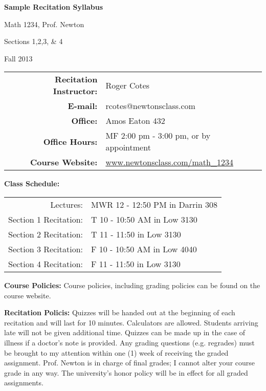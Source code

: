 \documentclass[fleqn, letterpaper]{article}
\begin{document}
\noindent




\begin{center}\textbf{Sample Recitation Syllabus}\end{center}

\noindent
\begin{bf}
Math 1234, Prof. Newton

Sections 1,2,3, \& 4

Fall 2013
\end{bf}

\vspace{.5 cm}

\noindent
\begin{tabular}{rl}

\bf{Recitation Instructor:} & Roger Cotes \\

\bf{E-mail:} & rcotes@newtonsclass.com \\

\bf{Office:} & Amos Eaton 432 \\

\bf{Office Hours:} & MF 2:00 pm - 3:00 pm, or by appointment \\

\bf{Course Website:} & \url{www.newtonsclass.com/math_1234} \\

\end{tabular}

\vspace{.5 cm}

{\bfseries Class Schedule:} \begin{tabular}{rl}
Lectures: & MWR 12 - 12:50 PM in Darrin 308\\
Section 1 Recitation: & T 10 - 10:50 AM in Low 3130 \\
Section 2 Recitation: & T 11 - 11:50 in Low 3130 \\
Section 3 Recitation: & F 10 - 10:50 AM in Low 4040 \\
Section 4 Recitation: & F 11 - 11:50 in Low 3130 \\
\end{tabular}

\vspace{.5 cm}


\noindent
{\bfseries Course Policies:} Course policies, including grading policies can be found on the course website.

\vspace{.5 cm}

\noindent
{\bfseries Recitation Policis:} Quizzes will be handed out at the beginning of each recitation and will last for 10 minutes. Calculators are allowed. Students arriving late will not be given additional time. Quizzes can be made up in the case of illness if a doctor's note is provided. Any grading questions (e.g. regrades) must be brought to my attention within one (1) week of receiving the graded assignment. Prof. Newton is in charge of final grades; I cannot alter your course grade in any way. The university's honor policy will be in effect for all graded assignments. 
\end{document}
